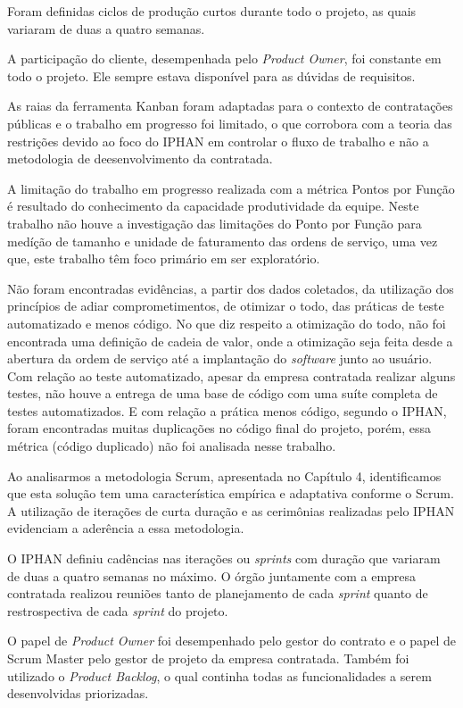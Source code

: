 Foram definidas ciclos de produção curtos durante todo o projeto, as quais variaram de duas a quatro semanas.

A participação do cliente, desempenhada pelo \textit{Product Owner}, foi constante em todo o projeto. Ele sempre estava disponível para as dúvidas de requisitos.

As raias da ferramenta Kanban foram adaptadas para o contexto de contratações públicas e o trabalho em progresso foi limitado, o que corrobora com a teoria das restrições devido ao foco do IPHAN em controlar o fluxo de trabalho e não a metodologia de deesenvolvimento da contratada.

A limitação do trabalho em progresso realizada com a métrica Pontos por Função é resultado do conhecimento da capacidade produtividade da equipe. Neste trabalho não houve a investigação das limitações do Ponto por Função para medíção de tamanho e unidade de faturamento das ordens de serviço, uma vez que, este trabalho têm foco primário em ser exploratório.  

Não foram encontradas evidências, a partir dos dados coletados, da utilização dos princípios de adiar comprometimentos, de otimizar o todo, das práticas de teste automatizado e menos código. No que diz respeito a otimização do todo, não foi encontrada uma definição de cadeia de valor, onde a otimização seja feita desde a abertura da ordem de serviço até a implantação do \textit{software} junto ao usuário. Com relação ao teste automatizado, apesar da empresa contratada realizar alguns testes, não houve a entrega de uma base de código com uma suíte completa de testes automatizados. E com relação a prática menos código, segundo o IPHAN, foram encontradas muitas duplicações no código final do projeto, porém, essa métrica (código duplicado) não foi analisada nesse trabalho.

Ao analisarmos a metodologia Scrum, apresentada no Capítulo 4, identificamos que esta solução tem uma característica empírica e adaptativa conforme o Scrum. A utilização de iterações de curta duração e as cerimônias realizadas pelo IPHAN evidenciam a aderência a essa metodologia.

O IPHAN definiu cadências nas iterações ou \textit{sprints} com duração que variaram de duas a quatro semanas no máximo. O órgão juntamente com a empresa contratada realizou reuniões tanto de planejamento de cada \textit{sprint} quanto de restrospectiva de cada \textit{sprint} do projeto. 

O papel de \textit{Product Owner} foi desempenhado pelo gestor do contrato e o papel de Scrum Master pelo gestor de projeto da empresa contratada. Também foi utilizado o \textit{Product Backlog}, o qual continha todas as funcionalidades a serem desenvolvidas priorizadas. 

